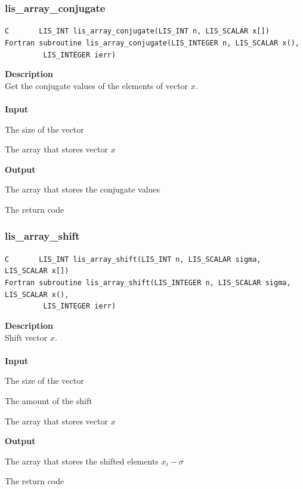 \documentclass[a4paper]{article}
\newcommand{\namelistlabel}[1]{\mbox{#1}\hfill}
\newenvironment{namelist}[1]{%
\begin{list}{}
  {\let\makelabel\namelistlabel
  \settowidth{\labelwidth}{#1}
  \setlength{\leftmargin}{1.1\labelwidth}}
  }{%
\end{list}}
\begin{document}
\subsubsection{lis\_array\_conjugate}
\begin{screen}
\verb|C       LIS_INT lis_array_conjugate(LIS_INT n, LIS_SCALAR x[])|\\
\verb|Fortran subroutine lis_array_conjugate(LIS_INTEGER n, LIS_SCALAR x(),|\\
\verb|         LIS_INTEGER ierr)|
\end{screen}
{\bf Description}\\
\indent
Get the conjugate values of the elements of vector $x$.
\\ \\
\noindent
{\bf Input}
\begin{namelist}{XXXXXXXXXXXXXXXXXXXX}
\item[\tt n] The size of the vector
\item[\tt x] The array that stores vector $x$
\end{namelist}
{\bf Output}
\begin{namelist}{XXXXXXXXXXXXXXXXXXXX}
\item[\tt x] The array that stores the conjugate values
\item[\tt ierr] The return code
\end{namelist}

\newpage
\subsubsection{lis\_array\_shift}
\begin{screen}
\verb|C       LIS_INT lis_array_shift(LIS_INT n, LIS_SCALAR sigma, LIS_SCALAR x[])|\\
\verb|Fortran subroutine lis_array_shift(LIS_INTEGER n, LIS_SCALAR sigma, LIS_SCALAR x(),|\\
\verb|         LIS_INTEGER ierr)|
\end{screen}
{\bf Description}\\
\indent
Shift vector $x$.
\\ \\
\noindent
{\bf Input}
\begin{namelist}{XXXXXXXXXXXXXXXXXXXX}
\item[\tt n] The size of the vector
\item[\tt sigma] The amount of the shift
\item[\tt x] The array that stores vector $x$
\end{namelist}
{\bf Output}
\begin{namelist}{XXXXXXXXXXXXXXXXXXXX}
\item[\tt x] The array that stores the shifted elements $x_i-\sigma$ 
\item[\tt ierr] The return code
\end{namelist}
\end{document}

